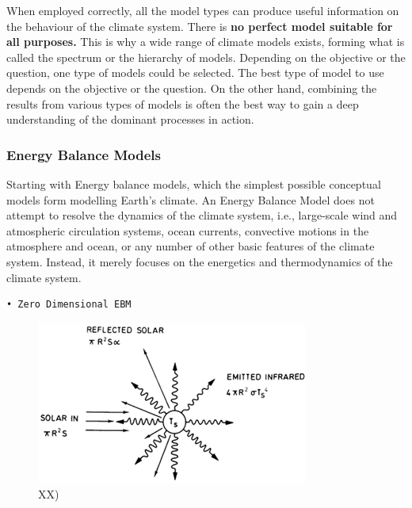\documentclass[12pt,oneside]{book}
\begin{document}
When employed correctly, all the model types can produce useful
information on the behaviour of the climate system. There is \textbf{no
perfect model suitable for all purposes.} This is why a wide range of
climate models exists, forming what is called the spectrum or the
hierarchy of models. Depending on the objective or the question, one
type of models could be selected. The best type of model to use depends
on the objective or the question. On the other hand, combining the
results from various types of models is often the best way to gain a
deep understanding of the dominant processes in action.

\subsubsection{Energy Balance Models}\label{energy-balance-models}

Starting with Energy balance models, which the simplest possible
conceptual models form modelling Earth's climate. An Energy Balance
Model does not attempt to resolve the dynamics of the climate system,
i.e., large-scale wind and atmospheric circulation systems, ocean
currents, convective motions in the atmosphere and ocean, or any number
of other basic features of the climate system. Instead, it merely
focuses on the energetics and thermodynamics of the climate system.

\begin{verbatim}
• Zero Dimensional EBM
\end{verbatim}

\begin{figure}

{\centering \includegraphics[width=0.8\linewidth]{figures/Figure79} 

}

\caption{XX)}\label{fig:EnergyBalanceModels}
\end{figure}
\end{document}
